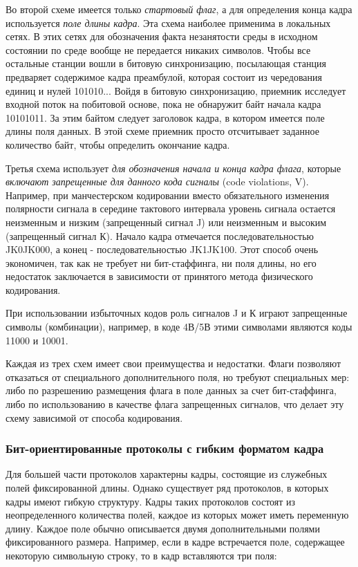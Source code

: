 Во второй схеме имеется только \emph{стартовый флаг}, а для определения конца кадра используется \emph{поле длины кадра}.
Эта схема наиболее применима в локальных сетях.
В этих сетях для обозначения факта незанятости среды в исходном состоянии по среде вообще не передается никаких символов.
Чтобы все остальные станции вошли в битовую синхронизацию, посылающая станция предваряет содержимое кадра преамбулой, которая состоит из чередования единиц и нулей 101010...
Войдя в битовую синхронизацию, приемник исследует входной поток на побитовой основе, пока не обнаружит байт начала кадра 10101011.
За этим байтом следует заголовок кадра, в котором имеется поле длины поля данных.
В этой схеме приемник просто отсчитывает заданное количество байт, чтобы определить окончание кадра.

Третья схема использует \emph{для обозначения начала и конца кадра флага}, которые \emph{включают запрещенные для данного кода сигналы} (code violations, V).
Например, при манчестерском кодировании вместо обязательного изменения полярности сигнала в середине тактового интервала уровень сигнала остается неизменным и низким (запрещенный сигнал J) или неизменным и высоким (запрещенный сигнал К).
Начало кадра отмечается последовательностью JK0JK000, а конец - последовательностью JK1JK100.
Этот способ очень экономичен, так как не требует ни бит-стаффинга, ни поля длины, но его недостаток заключается в зависимости от принятого метода физического кодирования.

При использовании избыточных кодов роль сигналов J и К играют запрещенные символы (комбинации), например, в коде 4В/5В этими символами являются коды 11000 и 10001.

Каждая из трех схем имеет свои преимущества и недостатки.
Флаги позволяют отказаться от специального дополнительного поля, но требуют специальных мер: либо по разрешению размещения флага в поле данных за счет бит-стаффинга, либо по использованию в качестве флага запрещенных сигналов, что делает эту схему зависимой от способа кодирования.

\subsubsection{Бит-ориентированные протоколы с гибким форматом кадра}

Для большей части протоколов характерны кадры, состоящие из служебных полей фиксированной длины.
Однако существует ряд протоколов, в которых кадры имеют гибкую структуру.
Кадры таких протоколов состоят из неопределенного количества полей, каждое из которых может иметь переменную длину.
Каждое поле обычно описывается двумя дополнительными полями фиксированного размера.
Например, если в кадре встречается поле, содержащее некоторую символьную строку, то в кадр вставляются три поля:

